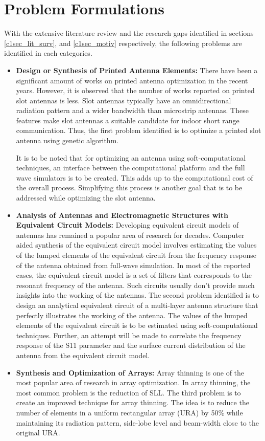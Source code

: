 \section{Problem Formulations} \label{c1sec_prob}
With the extensive literature review and the research gaps identified in sections \ref{c1sec_lit_surv}, and \ref{c1sec_motiv} respectively, the following problems are identified in each categories.

\begin{itemize}
\item \textbf{Design or Synthesis of Printed Antenna Elements:} There have been a significant amount of works on printed antenna optimization in the recent years. However, it is observed that the number of works reported on printed slot antennas is less. Slot antennas typically have an omnidirectional radiation pattern and a wider bandwidth than microstrip antennas. These features make slot antennas a suitable candidate for indoor short range communication. Thus, the first problem identified is to optimize a printed slot antenna using genetic algorithm.

    It is to be noted that for optimizing an antenna using soft-computational techniques, an interface between the computational platform and the full wave simulators is to be created. This adds up to the computational cost of the overall process. Simplifying this process is another goal that is to be addressed while optimizing the slot antenna.
\item \textbf{Analysis of Antennas and Electromagnetic Structures with Equivalent Circuit Models:} Developing equivalent circuit models of antennas has remained a popular area of research for decades. Computer aided synthesis of the equivalent circuit model involves estimating the values of the lumped elements of the equivalent circuit from the frequency response of the antenna obtained from full-wave simulation. In most of the reported cases, the equivalent circuit model is a set of filters that corresponds to the resonant frequency of the antenna. Such circuits usually don't provide much insights into the working of the antennas. The second problem identified is to design an analytical equivalent circuit of a multi-layer antenna structure that perfectly illustrates the working of the antenna. The values of the lumped elements of the equivalent circuit is to be estimated using soft-computational techniques. Further, an attempt will be made to correlate the frequency response of the S11 parameter and the surface current distribution of the antenna from the equivalent circuit model.
\item \textbf{Synthesis and Optimization of Arrays:} Array thinning is one of the most popular area of research in array optimization. In array thinning, the most common problem is the reduction of SLL. The third problem is to create an improved technique for array thinning. The idea is to reduce the number of elements in a uniform rectangular array (URA) by 50\% while maintaining its radiation pattern, side-lobe level and beam-width close to the original URA.


\end{itemize}
